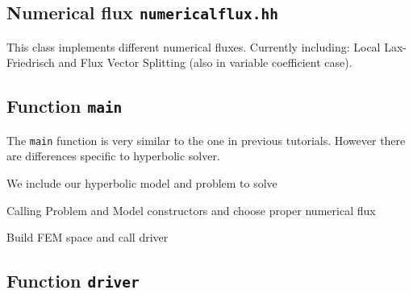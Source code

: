 \documentclass[a4paper,12pt]{article}
\theoremstyle{definition}
\theoremstyle{definition}
\begin{document}
 






\subsection{Numerical flux \lstinline{numericalflux.hh}}

This class implements different numerical fluxes. Currently including: Local Lax-Friedrisch and  Flux Vector Splitting (also in variable coefficient case).





\subsection{Function \lstinline{main}}

The \lstinline{main} function is very similar to the one in previous tutorials. However there are differences specific to hyperbolic solver.



We include our hyperbolic model and problem to solve



Calling Problem and Model constructors and choose proper numerical flux




Build FEM space and call driver




\subsection{Function \lstinline{driver}}
\label{sec:funct-driver}
\end{document}
